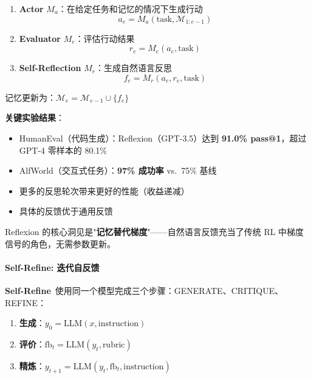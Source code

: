 \begin{enumerate}
\item \textbf{Actor} $M_a$：在给定任务和记忆的情况下生成行动
\begin{equation}
a_e = M_a(\text{task}, \mathcal{M}_{1:e-1})
\label{eq:reflexion-actor}
\end{equation}

\item \textbf{Evaluator} $M_e$：评估行动结果
\begin{equation}
r_e = M_e(a_e, \text{task})
\label{eq:reflexion-eval}
\end{equation}

\item \textbf{Self-Reflection} $M_r$：生成自然语言反思
\begin{equation}
f_e = M_r(a_e, r_e, \text{task})
\label{eq:reflexion-reflect}
\end{equation}
\end{enumerate}

记忆更新为：$\mathcal{M}_e = \mathcal{M}_{e-1} \cup \{f_e\}$

\textbf{关键实验结果}：
\begin{itemize}
\item HumanEval（代码生成）：Reflexion（GPT-3.5）达到 \textbf{91.0\% pass@1}，超过 GPT-4 零样本的 80.1\%
\item AlfWorld（交互式任务）：\textbf{97\% 成功率} vs.\ 75\% 基线
\item 更多的反思轮次带来更好的性能（收益递减）
\item 具体的反馈优于通用反馈
\end{itemize}

Reflexion 的核心洞见是"\textbf{记忆替代梯度}"——自然语言反馈充当了传统 RL 中梯度信号的角色，无需参数更新。

\paragraph{Self-Refine: 迭代自反馈}

\textbf{Self-Refine}~\citep{selfrefine2023}使用同一个模型完成三个步骤：GENERATE、CRITIQUE、REFINE：

\begin{enumerate}
\item \textbf{生成}：$y_0 = \text{LLM}(x, \text{instruction})$
\item \textbf{评价}：$\text{fb}_t = \text{LLM}(y_t, \text{rubric})$
\item \textbf{精炼}：$y_{t+1} = \text{LLM}(y_t, \text{fb}_t, \text{instruction})$
\end{enumerate}

